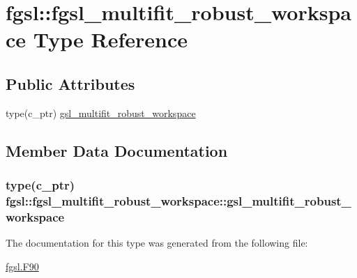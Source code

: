 \hypertarget{structfgsl_1_1fgsl__multifit__robust__workspace}{\section{fgsl\-:\-:fgsl\-\_\-multifit\-\_\-robust\-\_\-workspace Type Reference}
\label{structfgsl_1_1fgsl__multifit__robust__workspace}
}
\subsection*{Public Attributes}
\begin{DoxyCompactItemize}
\item 
type(c\-\_\-ptr) \hyperlink{structfgsl_1_1fgsl__multifit__robust__workspace_ad3fb445413e5ff78b4f5a3fdabd3b984}{gsl\-\_\-multifit\-\_\-robust\-\_\-workspace}
\end{DoxyCompactItemize}


\subsection{Member Data Documentation}
\hypertarget{structfgsl_1_1fgsl__multifit__robust__workspace_ad3fb445413e5ff78b4f5a3fdabd3b984}{
\subsubsection[{gsl\-\_\-multifit\-\_\-robust\-\_\-workspace}]{\setlength{\rightskip}{0pt plus 5cm}type(c\-\_\-ptr) fgsl\-::fgsl\-\_\-multifit\-\_\-robust\-\_\-workspace\-::gsl\-\_\-multifit\-\_\-robust\-\_\-workspace}}\label{structfgsl_1_1fgsl__multifit__robust__workspace_ad3fb445413e5ff78b4f5a3fdabd3b984}


The documentation for this type was generated from the following file\-:\begin{DoxyCompactItemize}
\item 
\hyperlink{fgsl_8F90}{fgsl.\-F90}\end{DoxyCompactItemize}
